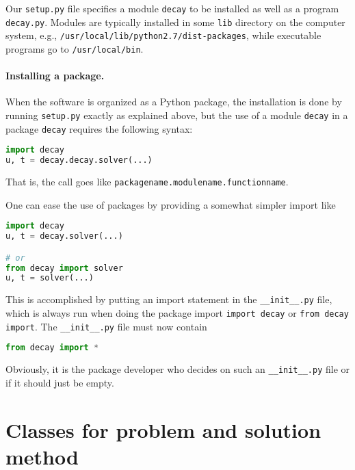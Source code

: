 \documentclass[graybox,sectrefs,envcountresetchap,open=right,final]{svmonodo}
\newenvironment{notice_mdfboxadmon}[1][]{
\begin{notice_mdfboxmdframed}[frametitle=#1]
}
{
\end{notice_mdfboxmdframed}
}
\begin{document}
Our \texttt{setup.py} file specifies a module \texttt{decay} to be installed as well
as a program \texttt{decay.py}.  Modules are typically installed in some \texttt{lib}
directory on the computer system, e.g.,
\texttt{/usr/local/lib/python2.7/dist-packages}, while executable programs go
to \texttt{/usr/local/bin}.


\paragraph{Installing a package.}
When the software is organized as a Python package, the installation is
done by running \texttt{setup.py} exactly as explained above, but the use of a module
\texttt{decay} in a package \texttt{decay} requires the following syntax:

\begin{lstlisting}[language=Python,style=blue1_bluegreen]
import decay
u, t = decay.decay.solver(...)
\end{lstlisting}
That is, the call goes like \texttt{packagename.modulename.functionname}.


\begin{notice_mdfboxadmon}
One can ease the use of packages by providing a somewhat simpler
import like

\begin{lstlisting}[language=Python,style=blue1_bluegreen]
import decay
u, t = decay.solver(...)

# or
from decay import solver
u, t = solver(...)
\end{lstlisting}
This is accomplished by putting an import statement in the \Verb!__init__.py!
file, which is always run when doing the package import \texttt{import decay}
or \texttt{from decay import}. The \Verb!__init__.py! file must now contain

\begin{lstlisting}[language=Python,style=blue1bar_bluegreen]
from decay import *
\end{lstlisting}
Obviously, it is the package developer who decides on such an
\Verb!__init__.py! file or if it should just be empty.
\end{notice_mdfboxadmon}




\section{Classes for problem and solution method}
\label{softeng1:prog:se:class}
\end{document}
